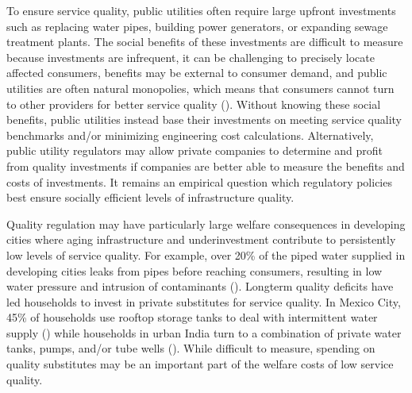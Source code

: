 \documentclass[12pt,table]{article}
\begin{document}
To ensure service quality, public utilities often require large upfront investments such as replacing water pipes, building power generators, or expanding sewage treatment plants.  The social benefits of these investments are  difficult to measure because investments are infrequent, it can be challenging to precisely locate affected consumers, benefits may be external to consumer demand, and public utilities are often natural monopolies, which means that consumers cannot turn to other providers for better service quality (\cite{spence1975monopoly}).  Without knowing these social benefits, public utilities instead base their investments on meeting service quality benchmarks and/or minimizing engineering cost calculations.  Alternatively, public utility regulators may allow private companies to determine and profit from quality investments if companies are better able to measure the benefits and costs of investments.  It remains an empirical question which regulatory policies best ensure socially efficient levels of infrastructure quality.

Quality regulation may have particularly large welfare consequences in developing cities where aging infrastructure and underinvestment contribute to persistently low levels of service quality.  For example, over 20\% of the piped water supplied in developing cities leaks from pipes before reaching consumers, resulting in low water pressure and intrusion of contaminants (\cite{liemberger2006challenge}).  Longterm quality deficits have led households to invest in private substitutes for service quality.  In Mexico City, 45\% of households use rooftop storage tanks to deal with intermittent water supply (\cite{baisa2010welfare}) while households in urban India turn to a combination of private water tanks, pumps, and/or tube wells (\cite{mckenzie2009urban}).  While difficult to measure, spending on quality substitutes may be an important part of the welfare costs of low service quality.  
\end{document}
